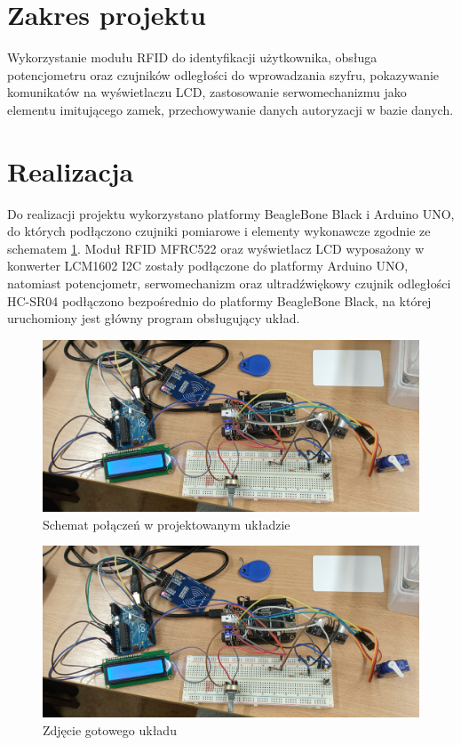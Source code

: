 \documentclass[polish,polish,a4paper]{article}
\begin{document}
	
	
	
	\section{Zakres projektu}
	Wykorzystanie modułu RFID do identyfikacji użytkownika, obsługa potencjometru oraz czujników odległości do wprowadzania szyfru, pokazywanie komunikatów na wyświetlaczu LCD, zastosowanie serwomechanizmu jako elementu imitującego zamek, przechowywanie danych autoryzacji w bazie danych.
	
	\section{Realizacja}
	Do realizacji projektu wykorzystano platformy BeagleBone Black i Arduino UNO, do których podłączono czujniki pomiarowe i elementy wykonawcze zgodnie ze schematem \ref{schematic}. Moduł RFID MFRC522 oraz wyświetlacz LCD wyposażony w konwerter LCM1602 I2C zostały podłączone do platformy Arduino UNO, natomiast potencjometr, serwomechanizm oraz ultradźwiękowy czujnik odległości HC-SR04 podłączono bezpośrednio do platformy BeagleBone Black, na której uruchomiony jest główny program obsługujący układ.
	\begin{figure}[!h]
		\includegraphics[width=\textwidth]{uklad.jpg} %
		\caption{Schemat połączeń w projektowanym układzie}
		\label{schematic}
	\end{figure}
	\begin{figure}[!h]
		\includegraphics[width=\textwidth]{uklad.jpg}
		\caption{Zdjęcie gotowego układu}
	\end{figure}
\end{document}
